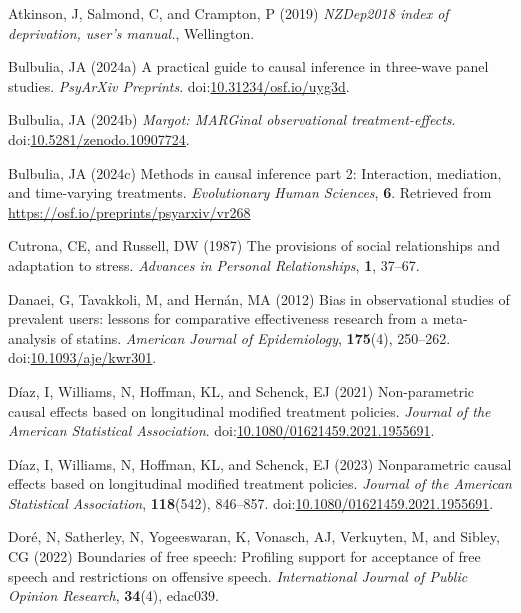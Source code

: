 \documentclass[
  single column]{article}
\newlength{\cslhangindent}
\newenvironment{CSLReferences}[2] %
 {\begin{list}{}{%
  \setlength{\itemindent}{0pt}
  \setlength{\leftmargin}{0pt}
  \setlength{\parsep}{0pt}
  \ifodd #1
   \setlength{\leftmargin}{\cslhangindent}
   \setlength{\itemindent}{-1\cslhangindent}
  \fi
  \setlength{\itemsep}{#2\baselineskip}}}
 {\end{list}}
\begin{document}
\label{refs}
\begin{CSLReferences}{1}{0}
Atkinson, J, Salmond, C, and Crampton, P (2019) \emph{NZDep2018 index of
deprivation, user{'}s manual.}, Wellington.

Bulbulia, JA (2024a) A practical guide to causal inference in three-wave
panel studies. \emph{PsyArXiv Preprints}.
doi:\href{https://doi.org/10.31234/osf.io/uyg3d}{10.31234/osf.io/uyg3d}.

Bulbulia, JA (2024b) \emph{Margot: MARGinal observational
treatment-effects}.
doi:\href{https://doi.org/10.5281/zenodo.10907724}{10.5281/zenodo.10907724}.

Bulbulia, JA (2024c) Methods in causal inference part 2: Interaction,
mediation, and time-varying treatments. \emph{Evolutionary Human
Sciences}, \textbf{6}. Retrieved from
\url{https://osf.io/preprints/psyarxiv/vr268}

Cutrona, CE, and Russell, DW (1987) The provisions of social
relationships and adaptation to stress. \emph{Advances in Personal
Relationships}, \textbf{1}, 37--67.

Danaei, G, Tavakkoli, M, and Hernán, MA (2012) Bias in observational
studies of prevalent users: lessons for comparative effectiveness
research from a meta-analysis of statins. \emph{American Journal of
Epidemiology}, \textbf{175}(4), 250--262.
doi:\href{https://doi.org/10.1093/aje/kwr301}{10.1093/aje/kwr301}.

Díaz, I, Williams, N, Hoffman, KL, and Schenck, EJ (2021) Non-parametric
causal effects based on longitudinal modified treatment policies.
\emph{Journal of the American Statistical Association}.
doi:\href{https://doi.org/10.1080/01621459.2021.1955691}{10.1080/01621459.2021.1955691}.

Díaz, I, Williams, N, Hoffman, KL, and Schenck, EJ (2023) Nonparametric
causal effects based on longitudinal modified treatment policies.
\emph{Journal of the American Statistical Association},
\textbf{118}(542), 846--857.
doi:\href{https://doi.org/10.1080/01621459.2021.1955691}{10.1080/01621459.2021.1955691}.

Doré, N, Satherley, N, Yogeeswaran, K, Vonasch, AJ, Verkuyten, M, and
Sibley, CG (2022) Boundaries of free speech: Profiling support for
acceptance of free speech and restrictions on offensive speech.
\emph{International Journal of Public Opinion Research}, \textbf{34}(4),
edac039.


\end{CSLReferences}
\end{document}
